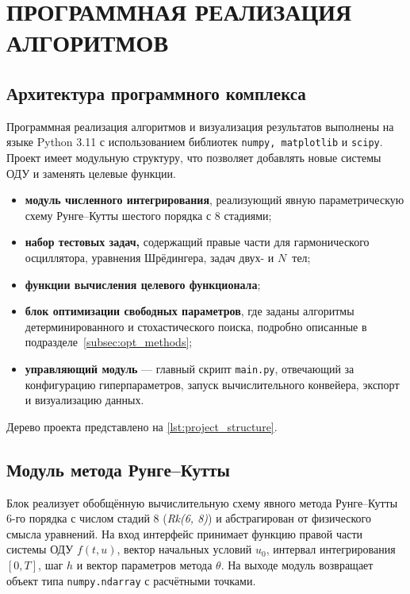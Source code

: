 \newpage
\pagestyle{plain}

\section{\centering ПРОГРАММНАЯ РЕАЛИЗАЦИЯ АЛГОРИТМОВ}
\subsection{Архитектура программного комплекса}
Программная реализация алгоритмов и визуализация результатов выполнены на языке Python 3.11 с использованием библиотек \texttt{numpy, matplotlib} и \texttt{scipy}. Проект имеет модульную структуру, что позволяет добавлять новые системы ОДУ и заменять целевые функции. 
\begin{itemize}
	\item \textbf{модуль численного интегрирования}, реализующий явную параметрическую схему Рунге--Кутты шестого порядка с 8 стадиями;
	\item \textbf{набор тестовых задач,} содержащий правые части для гармонического осциллятора, уравнения Шрёдингера, задач двух- и $N$~тел;
	\item \textbf{функции вычисления целевого функционала};
	\item \textbf{блок оптимизации свободных параметров}, где заданы алгоритмы детерминированного и стохастического поиска, подробно описанные в подразделе~\ref{subsec:opt_methods};
	\item \textbf{управляющий модуль} — главный скрипт \texttt{main.py}, отвечающий за конфигурацию гиперпараметров, запуск вычислительного конвейера, экспорт и визуализацию данных.
\end{itemize}
Дерево проекта представлено на \autoref{lst:project_structure}.

\subsection{Модуль метода Рунге--Кутты}
Блок реализует обобщённую вычислительную схему явного метода Рунге--Кутты 6-го порядка с числом стадий 8 (\textit{Rk(6, 8)}) и абстрагирован от физического смысла уравнений. На вход интерфейс принимает функцию правой части системы ОДУ $f(t, u)$, вектор начальных условий $u_0$, интервал интегрирования $[0, T]$, шаг $h$ и вектор параметров метода $\theta$. На выходе модуль возвращает объект типа \texttt{numpy.ndarray} с расчётными точками.

